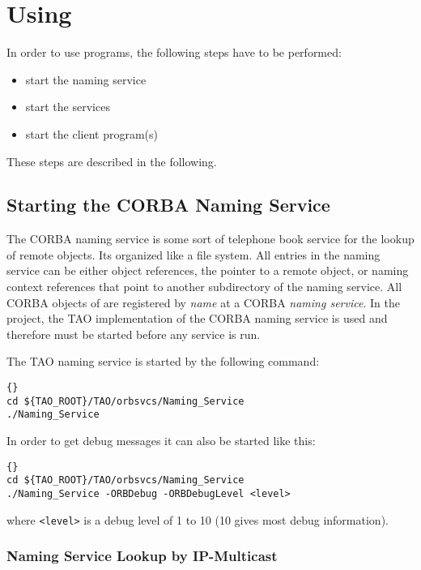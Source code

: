 \chapter{Using \miro}
\label{sec:using}

In order to use \miro programs, the following steps have to be performed:
\begin{itemize}
  \item start the naming service
  \item start the services
  \item start the client program(s)
\end{itemize}

These steps are described in the following.


\section{Starting the CORBA Naming Service}

The CORBA naming service is some sort of telephone book service for
the lookup of remote objects. Its organized like a file system. All
entries in the naming service can be either object references, the
pointer to a remote object, or naming context references that point to
another subdirectory of the naming service.  All CORBA objects of
\miro are registered by {\em name} at a CORBA {\em naming service}. In
the \miro project, the TAO implementation of the CORBA naming service
is used and therefore must be started before any service is run.

The TAO naming service is started by the following command:

\begin{lstlisting}[frame=tb]{}
cd ${TAO_ROOT}/TAO/orbsvcs/Naming_Service
./Naming_Service
\end{lstlisting}

In order to get debug messages it can also be started like this:

\begin{lstlisting}[frame=tb]{}
cd ${TAO_ROOT}/TAO/orbsvcs/Naming_Service
./Naming_Service -ORBDebug -ORBDebugLevel <level>
\end{lstlisting}

where {\tt <level>} is a debug level of 1 to 10 (10 gives most debug information).


\subsection{Naming Service Lookup by IP-Multicast}

